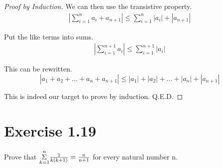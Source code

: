 \documentclass[12pt]{report}
\begin{document}
\begin{proof}[Proof by Induction]
    We can then use the transistive property.
    \begin{gather}
        \left|\sum_{i = 1}^{n} a_i + a_{n + 1} \right| \leq \sum_{i = 1}^{n} \left| a_i \right| + \left| a_{n + 1} \right|
    \end{gather}

    Put the like terms into sums.
    \begin{gather}
        \left|\sum_{i = 1}^{n + 1} a_i \right| \leq \sum_{i = 1}^{n + 1} \left| a_i \right|
    \end{gather}

    This can be rewritten.
    \begin{equation}
        \left| a_1 + a_2 + \dots + a_n + a_{n + 1} \right| \le \left|a_1\right| + \left|a_2\right| + \dots + \left|a_n\right| + \left|a_{n + 1}\right|
    \end{equation}

    This is indeed our target to prove by induction.
    Q.E.D.
\end{proof}

\pagebreak
\section{Exercise 1.19}
Prove that $\overunderset{n}{k = 1}{\Sigma}\frac{1}{k(k + 1)} = \frac{n}{n + 1}$ for every natural number n. 
\end{document}
